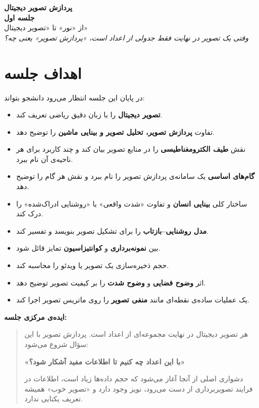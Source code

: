 \documentclass[11pt,a4paper]{article}
\begin{document}
	
	\begin{center}
		{\LARGE \textbf{پردازش تصویر دیجیتال}}\\[0.4cm]
		{\Large \textbf{جلسه اول}}\\[0.3cm]
		{\large از «نور» تا «تصویر دیجیتال»}\\[0.5cm]
		\textit{وقتی یک تصویر در نهایت فقط جدولی از اعداد است، «پردازش تصویر» یعنی چه؟}
	\end{center}
	
	\vspace{0.3cm}
	
	\section{اهداف جلسه}
	
	در پایان این جلسه انتظار می‌رود دانشجو بتواند:
	
	\begin{itemize}
		\item \textbf{تصویر دیجیتال} را با زبان دقیق ریاضی تعریف کند.
		\item تفاوت \textbf{پردازش تصویر، تحلیل تصویر و بینایی ماشین} را توضیح دهد.
		\item نقش \textbf{طیف الکترومغناطیسی} را در منابع تصویر بیان کند و چند کاربرد برای هر ناحیه‌ی آن نام ببرد.
		\item \textbf{گام‌های اساسی} یک سامانه‌ی پردازش تصویر را نام ببرد و نقش هر گام را توضیح دهد.
		\item ساختار کلی \textbf{بینایی انسان} و تفاوت «شدت واقعی» با «روشنایی ادراک‌شده» را درک کند.
		\item \textbf{مدل روشنایی--بازتاب} را برای تشکیل تصویر بنویسد و تفسیر کند.
		\item بین \textbf{نمونه‌برداری} و \textbf{کوانتیزاسیون} تمایز قائل شود.
		\item حجم ذخیره‌سازی یک تصویر یا ویدئو را محاسبه کند.
		\item اثر \textbf{وضوح فضایی} و \textbf{وضوح شدت} را بر کیفیت تصویر توضیح دهد.
		\item یک عملیات ساده‌ی نقطه‌ای مانند \textbf{منفی تصویر} را روی ماتریس تصویر اجرا کند.
	\end{itemize}
	
	\vspace{0.3cm}
	
	\noindent
	\textbf{ایده‌ی مرکزی جلسه:}
	
	\begin{quote}
		هر تصویر دیجیتال در نهایت مجموعه‌ای از اعداد است. پردازش تصویر با این سؤال شروع می‌شود:
		
		\begin{center}
			\textbf{«با این اعداد چه کنیم تا اطلاعات مفید آشکار شود؟»}
		\end{center}
		
		دشواری اصلی از آنجا آغاز می‌شود که حجم داده‌ها زیاد است، اطلاعات در فرایند تصویربرداری
		از دست می‌رود، نویز وجود دارد و «تصویر خوب» همیشه تعریف یکتایی ندارد.
	\end{quote}
	
\end{document}
